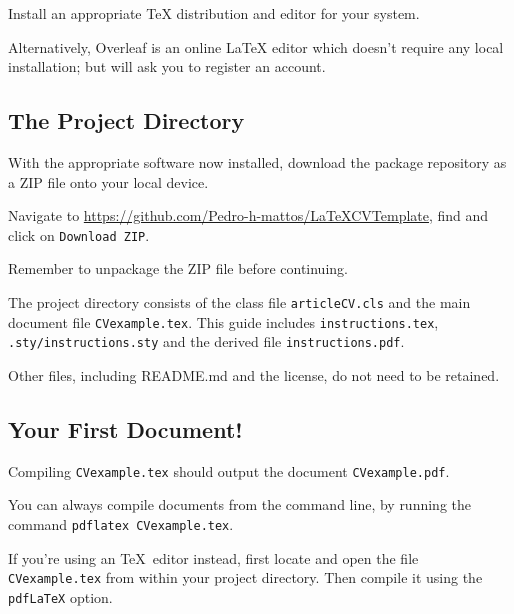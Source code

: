 \begin{instrct}
Install an appropriate TeX distribution and editor for your system. \par
\end{instrct}

Alternatively, Overleaf is an online LaTeX editor which doesn't require any local installation; but will ask you to register an account. \par

\subsection{The Project Directory}
With the appropriate software now installed, download the package repository as a ZIP file onto your local device. \par

\begin{instrct}
Navigate to \url{https://github.com/Pedro-h-mattos/LaTeXCVTemplate}, find and click on \lstinline|Download ZIP|.
\end{instrct}

Remember to unpackage the ZIP file before continuing. \par

The project directory consists of the class file \lstinline|articleCV.cls| and the main document file \lstinline|CVexample.tex|. This guide includes \lstinline|instructions.tex|, \lstinline|.sty/instructions.sty| and the derived file \lstinline|instructions.pdf|. \par

Other files, including README.md and the license, do not need to be retained. \par

\subsection{Your First Document!}
Compiling \lstinline|CVexample.tex| should output the document \lstinline|CVexample.pdf|. \par

You can always compile documents from the command line, by running the command \lstinline|pdflatex CVexample.tex|. \par

If you're using an \TeX~editor instead, first locate and open the file \lstinline|CVexample.tex| from within your project directory. Then compile it using the \lstinline|pdfLaTeX| option. \par

